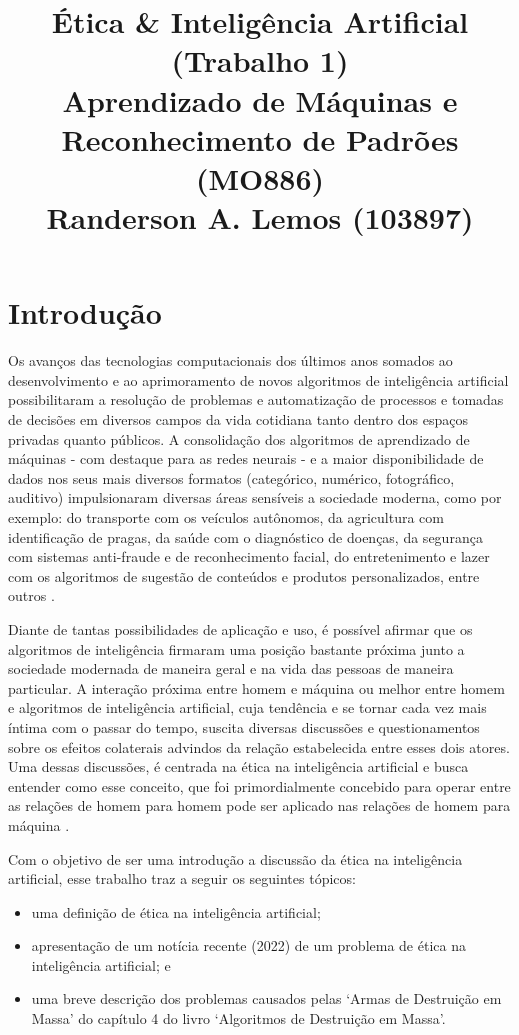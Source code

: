\documentclass{article}
\title{
	Ética \& Inteligência Artificial (Trabalho 1) \\
	\Large Aprendizado de Máquinas e Reconhecimento de Padrões (MO886) \\
	Randerson A. Lemos (103897)
}
\date{\vspace{-5ex}}
\begin{document}
  \maketitle

%
\section*{Introdução}
Os avanços das tecnologias computacionais dos últimos anos somados ao desenvolvimento e ao aprimoramento de novos algoritmos de inteligência artificial possibilitaram a resolução de problemas e automatização de processos e tomadas de decisões em diversos campos da vida cotidiana tanto dentro dos espaços privadas quanto públicos. A consolidação dos algoritmos de aprendizado de máquinas - com destaque para as redes neurais - e a maior disponibilidade de dados nos seus mais diversos formatos (categórico, numérico, fotográfico, auditivo) impulsionaram diversas áreas sensíveis a sociedade moderna, como por exemplo: do transporte com os veículos autônomos, da agricultura com identificação de pragas, da saúde com o diagnóstico de doenças, da segurança com sistemas anti-fraude e de reconhecimento facial, do entretenimento e lazer com os algoritmos de sugestão de conteúdos e produtos personalizados, entre outros \cite{Ludermir_2021}.

Diante de tantas possibilidades de aplicação e uso, é possível afirmar que os algoritmos de inteligência firmaram uma posição bastante próxima junto a sociedade modernada de maneira geral e na vida das pessoas de maneira particular. A interação próxima entre homem e máquina ou melhor entre homem e algoritmos de inteligência artificial, cuja tendência e se tornar cada vez mais íntima com o passar do tempo, suscita diversas discussões e questionamentos sobre os efeitos colaterais advindos da relação estabelecida entre esses dois atores. Uma dessas discussões, é centrada na ética na inteligência artificial e busca entender como esse conceito, que foi primordialmente concebido para operar entre as relações de homem para homem pode ser aplicado nas relações de homem para máquina \cite{Ludermir_2021}. 

Com o objetivo de ser uma introdução a discussão da ética na inteligência artificial, esse trabalho traz a seguir os seguintes tópicos:
\begin{itemize}
	\item uma definição de ética na inteligência artificial;
	\item apresentação de um notícia recente (2022) de um problema de ética na inteligência artificial; e
	\item uma breve descrição dos problemas causados pelas `Armas de Destruição em Massa' do capítulo 4 do livro `Algoritmos de Destruição em Massa'.
\end{itemize}
\end{document}

